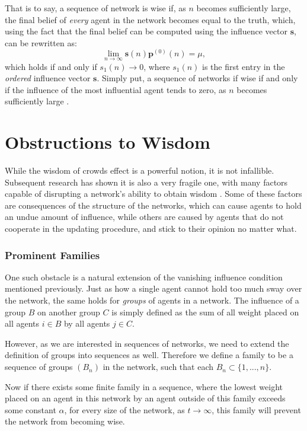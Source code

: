 \documentclass[a4paper, 12pt]{report}
\begin{document}
\noindent That is to say, a sequence of network is wise if, as $n$ becomes sufficiently large, the final belief of \emph{every} agent in the network becomes equal to the truth, which, using the fact that the final belief can be computed using the influence vector $\bm{s}$, can be rewritten as:
\begin{equation*}
    \label{wisdom:influence}
    \lim_{n\to\infty} \textbf{s}(n)\bm{p}^{(0)}(n) = \mu,
\end{equation*}
which holds if and only if $s_{1}(n) \to 0$, where $s_1(n)$ is the first entry in the \emph{ordered} influence vector $\bm{s}$. Simply put, a sequence of networks if wise if and only if the influence of the most influential agent tends to zero, as $n$ becomes sufficiently large \parencite{golub2010naive}.

\section{Obstructions to Wisdom}
While the wisdom of crowds effect is a powerful notion, it is not infallible. Subsequent research has shown it is also a very fragile one, with many factors capable of disrupting a network's ability to obtain wisdom \parencite{amir2021robust}. Some of these factors are consequences of the structure of the networks, which can cause agents to hold an undue amount of influence, while others are caused by agents that do not cooperate in the updating procedure, and stick to their opinion no matter what.

\subsubsection{Prominent Families}

One such obstacle is a natural extension of the vanishing influence condition mentioned previously. Just as how a single agent cannot hold too much sway over the network, the same holds for \emph{groups} of agents in a network. The influence of a group $B$ on another group $C$ is simply defined as the sum of all weight placed on all agents $i \in B$ by all agents $j \in C$. 

\noindent However, as we are interested in sequences of networks, we need to extend the definition of groups into sequences as well. Therefore we define a family to be a sequence of groups $(B_n)$ in the network, such that each $B_n \subset \{1, ..., n\}$.

\noindent Now if there exists some finite family in a sequence, where the lowest weight placed on an agent in this network by an agent outside of this family exceeds some constant $\alpha$, for every size of the network, as $t \to \infty$, this family will prevent the network from becoming wise.
\end{document}
